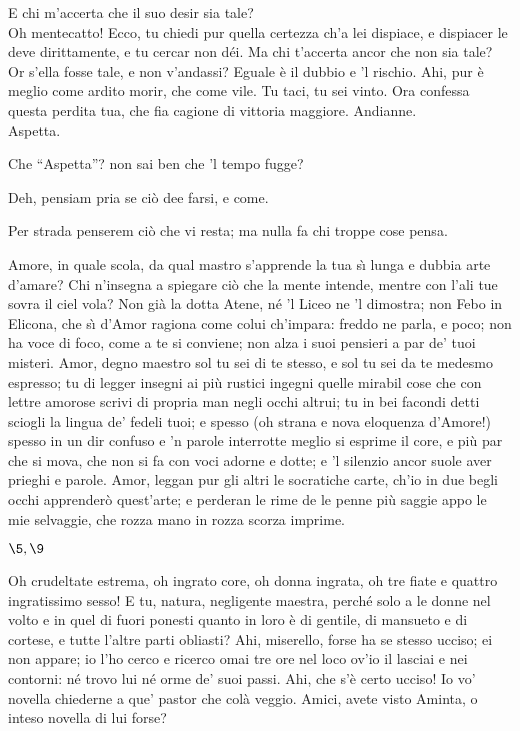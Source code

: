 \documentclass{book}
\begin{document}
   \4 E chi m'accerta
	che il suo desir sia tale? \\

   \5 Oh mentecatto!
	Ecco, tu chiedi pur quella certezza
	ch'a lei dispiace, e dispiacer le deve
	dirittamente, e tu cercar non d\'ei.
	Ma chi t'accerta ancor che non sia tale?
	Or s'ella fosse tale, e non v'andassi?
	Eguale \`e il dubbio e 'l rischio. Ahi, pur \`e meglio
	come ardito morir, che come vile.
	Tu taci, tu sei vinto. Ora confessa
	questa perdita tua, che fia cagione
	di vittoria maggiore. Andianne. \\

   \4 Aspetta.

	\5 Che ``Aspetta''? non sai ben che 'l tempo fugge?

	\4 Deh, pensiam pria se ci\`o dee farsi, e come.

	\5 Per strada penserem ci\`o che vi resta;
	ma nulla fa chi troppe cose pensa.

	\9 Amore, in quale scola,
	da qual mastro s'apprende
	la tua s\`{\i} lunga e dubbia arte d'amare?
	Chi n'insegna a spiegare
	ci\`o che la mente intende,
	mentre con l'ali tue sovra il ciel vola?
	Non gi\`a la dotta Atene,
	n\'e 'l Liceo ne 'l dimostra;
	non Febo in Elicona,
	che s\`{\i} d'Amor ragiona
	come colui ch'impara:
	freddo ne parla, e poco;
	non ha voce di foco,
	come a te si conviene;
	non alza i suoi pensieri
	a par de' tuoi misteri.
	Amor, degno maestro
	sol tu sei di te stesso,
	e sol tu sei da te medesmo espresso;
	tu di legger insegni
	ai pi\`u rustici ingegni
	quelle mirabil cose
	che con lettre amorose
	scrivi di propria man negli occhi altrui;
	tu in bei facondi detti
	sciogli la lingua de' fedeli tuoi;
	e spesso (oh strana e nova
	eloquenza d'Amore!)
	spesso in un dir confuso
	e 'n parole interrotte
	meglio si esprime il core,
	e pi\`u par che si mova,
	che non si fa con voci adorne e dotte;
	e 'l silenzio ancor suole
	aver prieghi e parole.
	Amor, leggan pur gli altri
	le socratiche carte,
	ch'io in due begli occhi apprender\`o quest'arte;
	e perderan le rime
	de le penne pi\`u saggie
	appo le mie selvaggie,
	che rozza mano in rozza scorza imprime.



\Atto

\Scena

\( \5, \9\)

	\5 Oh crudeltate estrema, oh ingrato core,
	oh donna ingrata, oh tre fiate e quattro
	ingratissimo sesso! E tu, natura,
	negligente maestra, perch\'e solo
	a le donne nel volto e in quel di fuori
	ponesti quanto in loro \`e di gentile,
	di mansueto e di cortese, e tutte
	l'altre parti obliasti? Ahi, miserello,
	forse ha se stesso ucciso; ei non appare;
	io l'ho cerco e ricerco omai tre ore
	nel loco ov'io il lasciai e nei contorni:
	n\'e trovo lui n\'e orme de' suoi passi.
	Ahi, che s'\`e certo ucciso! Io vo' novella
	chiederne a que' pastor che col\`a veggio.
	Amici, avete visto Aminta, o inteso
	novella di lui forse? \\
\end{document}
